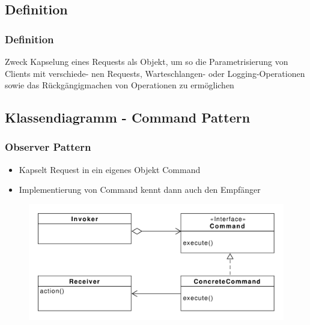 \subsection{Definition}
\begin{frame}
  \frametitle{Definition}
  \begin{block}{Zweck}
  	Kapselung eines Requests als Objekt, um so die Parametrisierung von Clients mit verschiede-
nen Requests, Warteschlangen- oder Logging-Operationen sowie das Rückgängigmachen von
Operationen zu ermöglichen
  \end{block}
  
\end{frame}

\subsection{Klassendiagramm - Command Pattern}
\begin{frame}
	\frametitle{Observer Pattern}		
	\begin{itemize}
		\item Kapselt Request in ein eigenes Objekt Command
		\item Implementierung von Command kennt dann auch den Empfänger
	\end{itemize}	
  	\begin{figure}
		\includegraphics[scale=.4]{paper/command/command}
	\end{figure}
\end{frame}

